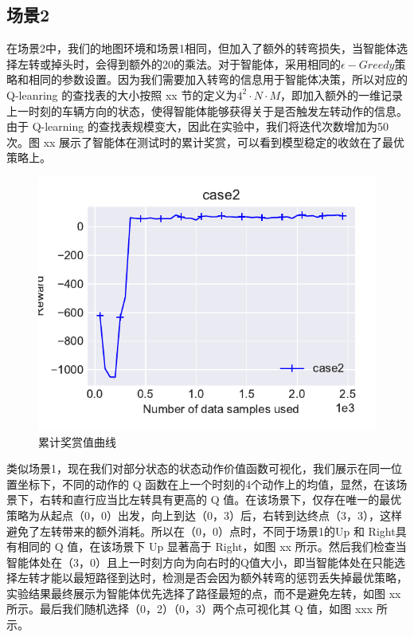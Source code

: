 \documentclass{standalone}
\begin{document}
\subsection{场景2}
在场景2中，我们的地图环境和场景1相同，但加入了额外的转弯损失，当智能体选择左转或掉头时，会得到额外的20的乘法。对于智能体，采用相同的$\epsilon-Greedy$策略和相同的参数设置。因为我们需要加入转弯的信息用于智能体决策，所以对应的 Q-leanring 的查找表的大小按照 xx 节的定义为$4^2 \cdot N\cdot M$，即加入额外的一维记录上一时刻的车辆方向的状态，使得智能体能够获得关于是否触发左转动作的信息。由于 Q-learning 的查找表规模变大，因此在实验中，我们将迭代次数增加为50次。图 xx 展示了智能体在测试时的累计奖赏，可以看到模型稳定的收敛在了最优策略上。
\begin{figure}
    \centering
    \includegraphics{pic/case2/case1.pdf}
    \caption{累计奖赏值曲线}
    \label{case2-1}
\end{figure}
类似场景1，现在我们对部分状态的状态动作价值函数可视化，我们展示在同一位置坐标下，不同的动作的 Q 函数在上一个时刻的4个动作上的均值，显然，在该场景下，右转和直行应当比左转具有更高的 Q 值。在该场景下，仅存在唯一的最优策略为从起点（0，0）出发，向上到达（0，3）后，右转到达终点（3，3），这样避免了左转带来的额外消耗。所以在（0，0）点时，不同于场景1的Up 和 Right具有相同的 Q 值，在该场景下 Up 显著高于 Right，如图 xx 所示。然后我们检查当智能体处在（3，0）且上一时刻方向为向右时的Q值大小，即当智能体处在只能选择左转才能以最短路径到达时，检测是否会因为额外转弯的惩罚丢失掉最优策略，实验结果最终展示为智能体优先选择了路径最短的点，而不是避免左转，如图 xx 所示。最后我们随机选择（0，2）（0，3）两个点可视化其 Q 值，如图 xxx 所示。
\end{document}
